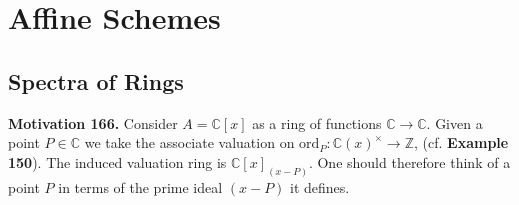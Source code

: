 \documentclass[12pt,a4paper,footinclude=true,headinclude=true]{scrbook} %
\newenvironment{motivation}[2][Motivation]
    { \begin{mdframed}[backgroundcolor=red!20] \textbf{#1 #2.} }
    {  \end{mdframed}}
\begin{document}
\chapter{Affine Schemes}

\section{Spectra of Rings}
\begin{motivation}{166}
    Consider $A=\mathbb{C}[x]$ as a ring of functions $\mathbb{C}\to\mathbb{C}$. Given a point $P\in\mathbb{C}$ we take the associate valuation on $\mathrm{ord}_P:\mathbb{C}(x)^\times\to\mathbb{Z}$, (cf. \textbf{Example 150}). The induced valuation ring is $\mathbb{C}[x]_{(x-P)}$. One should therefore think of a point $P$ in terms of the prime ideal $(x-P)$ it defines.
\end{motivation}
\end{document}
